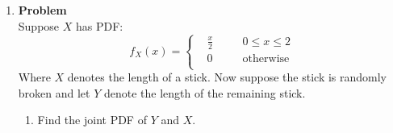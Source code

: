 \documentclass[12pt]{article}
\newenvironment{Ex}{\textbf{Problem}\vspace{.75em}\\}{}
\begin{document}
\begin{enumerate}
\begin{Ex}
\begin{solution}
\begin{enumerate}
\begin{equation}
\begin{aligned}
          \end{aligned}
        \end{equation}
        So now we can obtain the conditional joint density
        \begin{equation}
          \label{eq:2a-conditional-joint-density-plugged}
          \begin{aligned}
            f_{X,Y|A}(x,y) &= \frac{f_{X,Y}(x,y)}{P(Y \le 1/3)} \\
            &= \frac{\frac{5x^2}{2}}{\frac{45-2\sqrt{3}}{81}} \\
            \implies f_{X,Y|A}(x,y) &= \frac{405x^2}{2(45-2\sqrt{3})} \\
          \end{aligned}
        \end{equation}
        Or, more precisely
        \begin{equation}
          \label{eq:2a-sol}
          \implies f_{X,Y|A}(x,y) = \left\{
            \begin{aligned}
              & \frac{405x^2}{2(45-2\sqrt{3})} &&\quad (x,y) \in A \\
              & 0 &&\quad\text{otherwise} \\
            \end{aligned}\right.
        \end{equation}
      \item{\color{red}{\huge TODO}}
      \item{\color{red}{\huge TODO}}
      \end{enumerate}
    \end{solution}
  \end{Ex}
\item
  \begin{Ex}
    Suppose $X$ has PDF:
    \begin{equation}
      \label{eq:3-question}
      f_X(x) = \left\{
        \begin{aligned}
          &\frac{x}{2} &&\quad 0\le x\le 2 \\
          &0 &&\quad \text{otherwise} \\
        \end{aligned}\right.
    \end{equation}
    Where $X$ denotes the length of a stick. Now suppose the stick is
    randomly broken and let $Y$ denote the length of the remaining
    stick.
    \begin{enumerate}
    \item Find the joint PDF of $Y$ and $X$.

\end{enumerate}
\end{Ex}
\end{enumerate}
\end{document}
